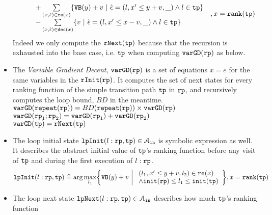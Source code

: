 \begin{defn}
\begin{itemize}
\[\begin{array}{l}
\begin{array}{l}
     \\ \qquad 
     + \sum\limits_{(x, \absevent) \in \reset(x) }
        \left\{ \varinvar(y) + v ~\middle\vert~ \absevent = (l, x' \leq y + v, \_) \land l \in \tpath\right\}
        \\ \qquad 
       - \sum\limits_{(x, \absevent) \in \dec(x) }\left\{ 
         v ~\middle\vert~ \absevent = (l, x' \leq x - v, \_) \land l \in \tpath 
         \right\}
       \end{array}
     \end{array}
     , x = \locbound(\tpath)
   \]
   Indeed we only compute the $\mathtt{rNext}(\mathtt{tp})$ because that the recursion is exhausted into the base case, i.e. $\mathtt{tp}$ when computing $\mathtt{varGD}(\mathtt{rp})$ as below.
   \item  The \emph{Variable Gradient Decent}, 
   $\mathtt{varGD}(\mathtt{rp})$
   is a set of equations $x = e$ for the same variables in the $\mathtt{rInit}(\mathtt{rp})$.
   It computes the set of next states for every ranking function of the simple transition path $\mathtt{tp}$ in $\mathtt{rp}$,
   and recursively computes the loop bound, $BD$ in the meantime.
   \\
   {$\mathtt{varGD}(\mathtt{repeat}(\mathtt{rp})) =  BD(\mathtt{repeat}(\mathtt{rp})) \times {\ensuremath{\mathtt{varGD}}(\ensuremath{\mathtt{rp}})}$}
   \\
   $\mathtt{varGD}(\mathtt{rp}_1;\mathtt{rp}_2) =  \mathtt{varGD}(\mathtt{rp}_1)+ \mathtt{varGD}(\mathtt{rp}_2)$
   \\
   $\mathtt{varGD}(\mathtt{tp}) =  \mathtt{rNext}(\mathtt{tp})$   
%
   \item 
The loop initial state 
$\mathtt{lpInit}(l: \mathtt{rp}, \mathtt{tp}) \in \mathcal{A}_{\mathtt{in}}$ is symbolic expression as well. 
It describes the abstract initial value of $\mathtt{tp}$'s ranking function before
any visit of $\mathtt{tp}$ and during the first execution of $l: \mathtt{rp}$.
\[
  \lpinit(l: \rprog, \tpath) \triangleq 
  \arg\max_{l_1}\left\{
       \varinvar(y) + v ~\middle\vert~ 
       \begin{array}{l} 
         (l_1, x' \leq y + v, l_2) \in \reset(x) 
         \\
         \land \absinit(\rprog) \leq l_1 \leq \absinit(\tpath)
       \end{array}
     \right\}
    , x = \locbound(\tpath)
  \]
\item
The loop next state 
$\mathtt{lpNext}(l: \mathtt{rp}, \mathtt{tp}) \in \mathcal{A}_{\mathtt{in}}$ 
describes how much $\mathtt{tp}$'s ranking function

\end{itemize}
\end{defn}
